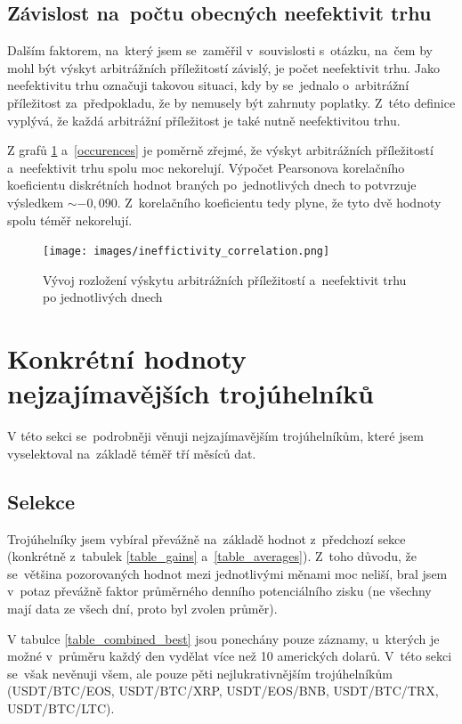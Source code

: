 \documentclass[thesis=B,czech]{FITthesis}[2019/03/21]
\begin{document}
\subsection{Závislost na~počtu obecných neefektivit trhu}
Dalším faktorem, na~který jsem se~zaměřil v~souvislosti s~otázku, na~čem by mohl být výskyt arbitrážních příležitostí závislý, je počet neefektivit trhu. Jako neefektivitu trhu označuji takovou situaci, kdy by se~jednalo o~arbitrážní příležitost za~předpokladu, že by nemusely být zahrnuty poplatky. Z~této definice vyplývá, že každá arbitrážní příležitost je také nutně neefektivitou trhu.

Z grafů \ref{ineffictivity_correlation} a~\ref{occurences} je poměrně zřejmé, že výskyt arbitrážních příležitostí a~neefektivit trhu spolu moc nekorelují. Výpočet Pearsonova korelačního koeficientu diskrétních hodnot braných po~jednotlivých dnech to potvrzuje výsledkem \(\sim-0,090\). Z~korelačního koeficientu tedy plyne, že tyto dvě hodnoty spolu téměř nekorelují.

\begin{figure}\centering
	\texttt{[image: images/ineffictivity\_correlation.png]}
	\caption{Vývoj rozložení výskytu arbitrážních příležitostí a~neefektivit trhu po jednotlivých dnech}
	\label{ineffictivity_correlation}
\end{figure}

\section{Konkrétní hodnoty nejzajímavějších trojúhelníků}
V této sekci se~podrobněji věnuji nejzajímavějším trojúhelníkům, které jsem vyselektoval na~základě téměř tří měsíců dat. 

\subsection{Selekce}
Trojúhelníky jsem vybíral převážně na~základě hodnot z~předchozí sekce \linebreak (konkrétně z~tabulek \ref{table_gains} a~\ref{table_averages}). Z~toho důvodu, že se~většina pozorovaných hodnot mezi jednotlivými měnami moc neliší, bral jsem v~potaz převážně faktor průměrného denního potenciálního zisku (ne všechny mají data ze všech dní, proto byl zvolen průměr).

V tabulce \ref{table_combined_best} jsou ponechány pouze záznamy, u~kterých je možné v~průměru každý den vydělat více než 10 amerických dolarů. V~této sekci se~však nevěnuji všem, ale pouze pěti nejlukrativnějším trojúhelníkům \linebreak (USDT/BTC/EOS, USDT/BTC/XRP, USDT/EOS/BNB, USDT/BTC/TRX, USDT/BTC/LTC).
\end{document}

